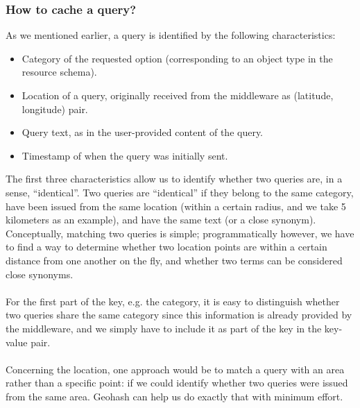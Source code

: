 \subsubsection{How to cache a query?}
As we mentioned earlier, a query is identified by the following characteristics:
\begin{itemize}
  \item Category of the requested option (corresponding to an object type in the resource schema).
  \item Location of a query, originally received from the middleware as (latitude, longitude) pair.
  \item Query text, as in the user-provided content of the query.
  \item Timestamp of when the query was initially sent.
\end{itemize}
The first three characteristics allow us to identify whether two queries are, in a sense, ``identical''. Two queries are ``identical'' if they belong to the same category, have been issued from the same location (within a certain radius, and we take 5 kilometers as an example), and have the same text (or a close synonym). Conceptually, matching two queries is simple; programmatically however, we have to find a way to determine whether two location points are within a certain distance from one another on the fly, and whether two terms can be considered close synonyms.\\\\
For the first part of the key, e.g. the category, it is easy to distinguish whether two queries share the same category since this information is already provided by the middleware, and we simply have to include it as part of the key in the key-value pair.\\\\
Concerning the location, one approach would be to match a query with an area rather than a specific point: if we could identify whether two queries were issued from the same area. Geohash can help us do exactly that with minimum effort.
